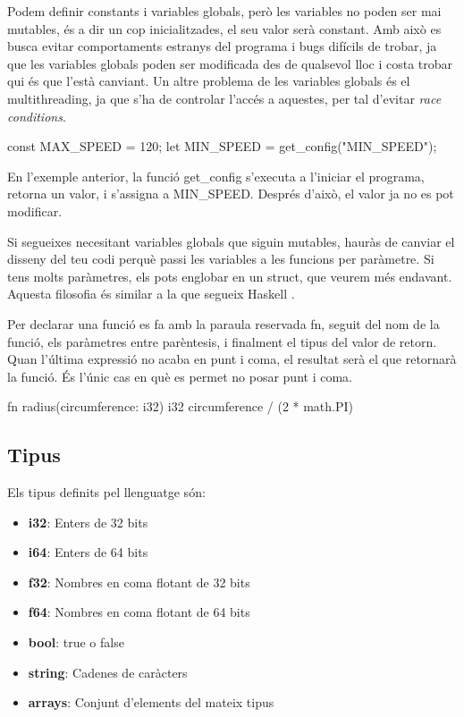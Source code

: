 ﻿\documentclass{article}
\begin{document}
Podem definir constants i variables globals, però les variables no poden ser
mai mutables, és a dir un cop inicialitzades, el seu valor serà constant. 
Amb això es busca evitar comportaments estranys del programa i bugs difícils de
trobar, ja que les variables globals poden ser modificada des de qualsevol lloc 
i costa trobar qui és que l'està canviant. Un altre problema de les variables 
globals és el multithreading, ja que s'ha de controlar l'accés a aquestes, per 
tal d'evitar \textit{race conditions}.

\begin{code}
const MAX_SPEED = 120;
let MIN_SPEED = get_config("MIN_SPEED");
\end{code}

En l'exemple anterior, la funció get\_config s'executa a l'iniciar el programa,
retorna un valor, i s'assigna a MIN\_SPEED. Després d'això, el valor ja no es
pot modificar.

Si segueixes necesitant variables globals que siguin mutables, hauràs de canviar
el disseny del teu codi perquè passi les variables a les funcions per paràmetre.
Si tens molts paràmetres, els pots englobar en un struct, que veurem més endavant.
Aquesta filosofia és similar a la que segueix Haskell \cite{globals-haskell}.

Per declarar una funció es fa amb la paraula reservada fn, seguit del nom de la
funció, els paràmetres entre parèntesis, i finalment el tipus del valor de retorn.
Quan l'última expressió no acaba en punt i coma, el resultat serà el que retornarà
la funció. És l'únic cas en què es permet no posar punt i coma.

\begin{code}
fn radius(circumference: i32) i32 {
    circumference / (2 * math.PI)
}
\end{code}

\subsection{Tipus}
Els tipus definits pel llenguatge són:

\begin{itemize}
    \item \textbf{i32}: Enters de 32 bits
    \item \textbf{i64}: Enters de 64 bits
    \item \textbf{f32}: Nombres en coma flotant de 32 bits
    \item \textbf{f64}: Nombres en coma flotant de 64 bits
    \item \textbf{bool}: true o false
    \item \textbf{string}: Cadenes de caràcters
    \item \textbf{arrays}: Conjunt d'elements del mateix tipus
\end{itemize}
\end{document}
